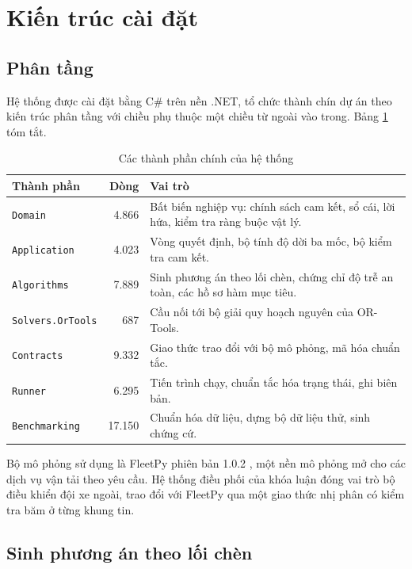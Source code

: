 \section{Kiến trúc cài đặt}

\subsection{Phân tầng}

Hệ thống được cài đặt bằng C\# trên nền .NET, tổ chức thành chín dự án theo kiến trúc phân tầng
với chiều phụ thuộc một chiều từ ngoài vào trong. Bảng \ref{bang:kientruc} tóm tắt.

\begin{table}[htbp]
\centering
\caption{Các thành phần chính của hệ thống}
\label{bang:kientruc}
\small
\begin{tabular}{@{}p{4.4cm}rp{7.4cm}@{}}
\toprule
\textbf{Thành phần} & \textbf{Dòng} & \textbf{Vai trò}\\
\midrule
\texttt{Domain} & 4.866 & Bất biến nghiệp vụ: chính sách cam kết, sổ cái, lời hứa, kiểm tra ràng buộc vật lý.\\
\texttt{Application} & 4.023 & Vòng quyết định, bộ tính độ dời ba mốc, bộ kiểm tra cam kết.\\
\texttt{Algorithms} & 7.889 & Sinh phương án theo lối chèn, chứng chỉ độ trễ an toàn, các hồ sơ hàm mục tiêu.\\
\texttt{Solvers.OrTools} & 687 & Cầu nối tới bộ giải quy hoạch nguyên của OR-Tools.\\
\texttt{Contracts} & 9.332 & Giao thức trao đổi với bộ mô phỏng, mã hóa chuẩn tắc.\\
\texttt{Runner} & 6.295 & Tiến trình chạy, chuẩn tắc hóa trạng thái, ghi biên bản.\\
\texttt{Benchmarking} & 17.150 & Chuẩn hóa dữ liệu, dựng bộ dữ liệu thử, sinh chứng cứ.\\
\bottomrule
\end{tabular}
\end{table}

Bộ mô phỏng sử dụng là FleetPy phiên bản 1.0.2 \cite{fleetpy2022}, một nền mô phỏng mở cho các
dịch vụ vận tải theo yêu cầu. Hệ thống điều phối của khóa luận đóng vai trò bộ điều khiển đội
xe ngoài, trao đổi với FleetPy qua một giao thức nhị phân có kiểm tra băm ở từng khung tin.

\subsection{Sinh phương án theo lối chèn}

